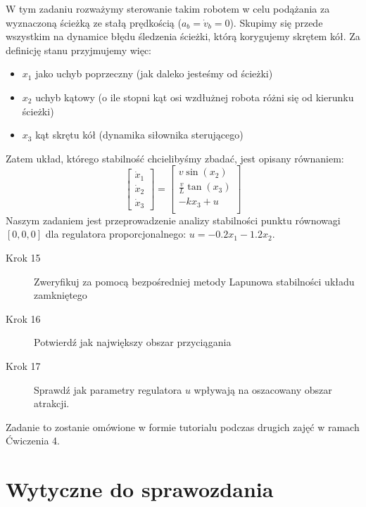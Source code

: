 \documentclass{sprawozdanie-agh}
\begin{document}
        W tym zadaniu rozważymy sterowanie takim robotem w celu podążania za wyznaczoną ścieżką ze stałą prędkością ($a_{b} = \dot{v}_b = 0$). 
    Skupimy się przede wszystkim na dynamice błędu śledzenia ścieżki, którą korygujemy skrętem kół.
    Za definicję stanu przyjmujemy więc:
    \begin{itemize}
        \item $x_1$ jako uchyb poprzeczny (jak daleko jesteśmy od ścieżki)
        \item $x_2$ uchyb kątowy (o ile stopni kąt osi wzdłużnej robota różni się od kierunku ścieżki)
        \item $x_3$ kąt skrętu kół (dynamika siłownika sterującego)
    \end{itemize}
    Zatem układ, którego stabilność chcielibyśmy zbadać, jest opisany równaniem:
    \begin{equation}
             \begin{bmatrix}
                \dot{x}_1 \\
                \dot{x}_2 \\ 
                \dot{x}_3 
            \end{bmatrix} = 
            \begin{bmatrix}
                v\sin{(x_2)}\\
                \frac{v}{L}\tan{(x_3)}\\
                -kx_3 + u\\
            \end{bmatrix}     
    \end{equation}
    Naszym zadaniem jest przeprowadzenie analizy stabilności punktu równowagi $[0, 0, 0]$ dla regulatora proporcjonalnego: $u = -0.2x_1-1.2x_2$.
    \begin{description}
        \item[Krok 15] Zweryfikuj za pomocą bezpośredniej metody Lapunowa stabilności układu zamkniętego
        \item[Krok 16] Potwierdź jak największy obszar przyciągania
        \item[Krok 17] Sprawdź jak parametry regulatora $u$ wpływają na oszacowany obszar atrakcji.
    \end{description}
    Zadanie to zostanie omówione w formie tutorialu podczas drugich zajęć w ramach Ćwiczenia 4.
    
    \section{Wytyczne do sprawozdania}
\end{document}
